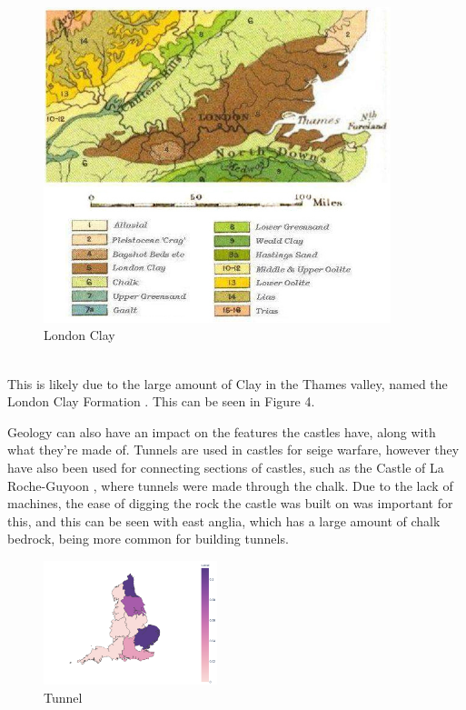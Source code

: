 \documentclass[12pt]{article}
\begin{document}
\begin{minipage}{0.45\textwidth}
	\begin{figure}[H]
		\centering
		\includegraphics[width=0.9\textwidth]{Geological_map_of_London_Basin.jpg}
		\caption{London Clay}
	\end{figure}
\end{minipage}
\vspace{1cm}
\\
This is likely due to the large amount of Clay in the Thames valley, named the London Clay Formation \cite{sumbler1996london}. This can be seen in Figure 4.

Geology can also have an impact on the features the castles have, along with what they're made of. Tunnels are used in castles for seige warfare, however they have also been used for connecting sections of castles, such as the Castle of La Roche-Guyoon \cite{HislopMalcolm2016Cb:a}, where tunnels were made through the chalk. Due to the lack of machines, the ease of digging the rock the castle was built on was important for this, and this can be seen with east anglia, which has a large amount of chalk bedrock, being more common for building tunnels.

\begin{figure}[H]
	\centering
	\includegraphics[width=0.45\textwidth]{tunnel.png}
	\caption{Tunnel}
\end{figure}
\end{document}
